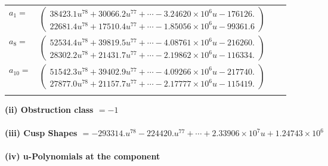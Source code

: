 \documentclass[1p]{elsarticle_modified}
\theoremstyle{definition}
\begin{document}
\begin{tabular}{m{7pt} m{180pt} m{7pt} m{180pt} }
\flushright $a_{1}=$&$\begin{pmatrix}38423.1 u^{78}+30066.2 u^{77}+\cdots-3.24620\times10^{6} u-176126.\\22681.4 u^{78}+17510.4 u^{77}+\cdots-1.85056\times10^{6} u-99361.6\end{pmatrix}$ \\
\flushright $a_{8}=$&$\begin{pmatrix}52534.4 u^{78}+39819.5 u^{77}+\cdots-4.08761\times10^{6} u-216260.\\28302.2 u^{78}+21431.7 u^{77}+\cdots-2.19862\times10^{6} u-116334.\end{pmatrix}$ \\
\flushright $a_{10}=$&$\begin{pmatrix}51542.3 u^{78}+39402.9 u^{77}+\cdots-4.09266\times10^{6} u-217740.\\27877.0 u^{78}+21157.7 u^{77}+\cdots-2.17777\times10^{6} u-115419.\end{pmatrix}$\\&\end{tabular}
\flushleft \textbf{(ii) Obstruction class $= -1$}\\~\\
\flushleft \textbf{(iii) Cusp Shapes $= -293314. u^{78}-224420. u^{77}+\cdots+2.33906\times10^{7} u+1.24743\times10^{6}$}\\~\\
\newpage\renewcommand{\arraystretch}{1}
\flushleft \textbf{(iv) u-Polynomials at the component}\newline \\
\end{document}
